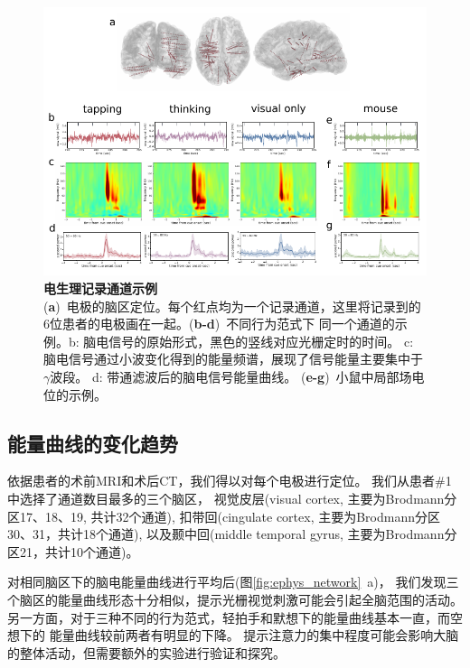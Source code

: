 \begin{figure}[h]
    \centering
    \includegraphics[width=\textwidth]{src/figures/ephys_examples.pdf}
    \caption{\textbf{电生理记录通道示例}\\
    (\textbf{a})~电极的脑区定位。每个红点均为一个记录通道，这里将记录到的
    6位患者的电极画在一起。(\textbf{b-d})~不同行为范式下
    同一个通道的示例。b: 脑电信号的原始形式，黑色的竖线对应光栅定时的时间。
    c: 脑电信号通过小波变化得到的能量频谱，展现了信号能量主要集中于\(\gamma\)波段。
    d: 带通滤波后的脑电信号能量曲线。
    (\textbf{e-g})~小鼠中局部场电位的示例。}
    \label{fig:ephys_example}
\end{figure}

\subsection{能量曲线的变化趋势}
依据患者的术前MRI和术后CT，我们得以对每个电极进行定位。
我们从患者\#1中选择了通道数目最多的三个脑区，
视觉皮层(visual cortex, 主要为Brodmann分区17、18、19, 共计32个通道),
扣带回(cingulate cortex, 主要为Brodmann分区30、31，共计18个通道),
以及颞中回(middle temporal gyrus, 主要为Brodmann分区21，共计10个通道)。

对相同脑区下的脑电能量曲线进行平均后(图\ref{fig:ephys_network}~a)，
我们发现三个脑区的能量曲线形态十分相似，提示光栅视觉刺激可能会引起全脑范围的活动。
另一方面，对于三种不同的行为范式，轻拍手和默想下的能量曲线基本一直，而空想下的
能量曲线较前两者有明显的下降。%
提示注意力的集中程度可能会影响大脑的整体活动，但需要额外的实验进行验证和探究。


